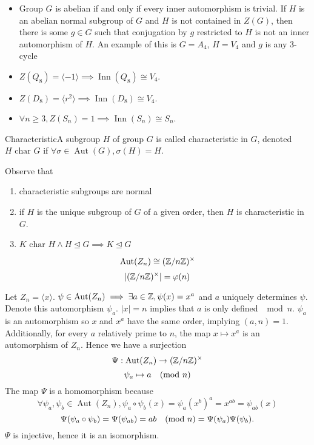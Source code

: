 \documentclass{report}
\newcommand{\mprop}[2]{\begin{Prop}{#1}{}#2\end{Prop}}
\newcommand{\ex}[2]{\begin{Example}{#1}{}#2\end{Example}}
\newcommand{\dfn}[2]{\begin{Definition}[colbacktitle=red!75!black]{#1}{}#2\end{Definition}}
\newenvironment{myproof}[1][\proofname]{%
	\proof[\bfseries #1: ]%
}{\endproof}
\newcommand{\charin}{\text{ char }}
\DeclareMathOperator{\Aut}{Aut}
\DeclareMathOperator{\Inn}{Inn}
\begin{document}
\ex{}{\begin{itemize}
    \item Group $G$ is abelian if and only if every inner automorphism is trivial. If $H$ is an abelian normal subgroup of $G$ and $H$ is not contained in $Z(G)$, then there is some $g \in G$ such that conjugation by $g$ restricted to $H$ is not an inner automorphism of $H$. An example of this is $G = A_4$, $H = V_4$ and $g$ is any 3-cycle
    \item $Z(Q_8) = \langle -1 \rangle \implies \Inn (Q_8) \cong V_4. $
    \item $Z(D_8) = \langle r^2 \rangle \implies \Inn(D_8) \cong V_4.$
    \item $\forall n \geq 3, Z(S_n) = 1 \implies \Inn(S_n) \cong S_n$. 
\end{itemize}}
\dfn{Characteristic}{A subgroup $H$ of group $G$ is called characteristic in $G$, denoted $H \charin G$ if $\forall \sigma \in \Aut(G), \sigma(H) = H$.}
Observe that 
\begin{enumerate}
    \item characteristic subgroups are normal
    \item if $H$ is the unique subgroup of $G$ of a given order, then $H$ is characteristic in $G$. 
    \item $K \charin H \land H \unlhd G \implies K \unlhd G$
\end{enumerate}
\mprop{}{$$\Aut(Z_n) \cong (\bbZ/n\bbZ)^\times$$
$$|(\mathbb{Z}/n\mathbb{Z})^\times| = \varphi(n)$$}
\begin{myproof}
    Let $Z_n = \langle x \rangle$. $\psi \in \Aut(Z_n) \implies \exists a \in \bbZ , \psi(x) = x^a$ and $a$ uniquely determines $\psi$. Denote this automorphism $\psi_a$. $|x| = n$ implies that $a$ is only defined $\mod n$. $\psi_a$ is an automorphism so $x$ and $x^a$ have the same order, implying $(a,n) =1$. Additionally, for every $a$ relatively prime to $n$, the map $x \mapsto x^a$ is an automorphism of $Z_n$. Hence we have a surjection 
    $$\Psi: \Aut(Z_n) \to (\bbZ/n\bbZ)^\times$$
    $$\psi_a \mapsto a \hspace{10 pt} (\text{mod } n)$$
    The map $\Psi$ is a homomorphism because
    $$\forall \psi_a, \psi_b \in \Aut(Z_n),  \psi_a \circ \psi_b (x) = \psi_a (x^b)^a = x^{ab} = \psi_{ab} (x)$$
    $$\Psi(\psi_a \circ \psi_b) = \Psi(\psi_{ab}) = ab \hspace{10 pt} (\text{mod } n) = \Psi(\psi_a) \Psi(\psi_b).$$
    $\Psi$ is injective, hence it is an isomorphism. 
\end{myproof}
\end{document}
